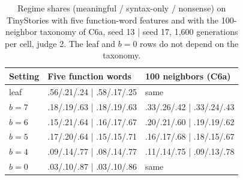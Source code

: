 \documentclass[11pt,letterpaper]{article}
\begin{document}
\begin{table}[h]
\caption{Regime shares (meaningful / syntax-only / nonsense) on TinyStories with five function-word features and with the 100-neighbor taxonomy of C6a, seed 13 | seed 17, 1,600 generations per cell, judge 2. The leaf and $b=0$ rows do not depend on the taxonomy.}
\label{tab:r232}
\begin{center}
\footnotesize
\begin{tabular}{lll}
\toprule
Setting & Five function words & 100 neighbors (C6a) \\
\midrule
leaf & .56/.21/.24 \;|\; .58/.17/.25 & same \\
$b=7$ & .18/.19/.63 \;|\; .18/.19/.63 & .33/.26/.42 \;|\; .33/.24/.43 \\
$b=6$ & .15/.21/.64 \;|\; .16/.17/.67 & .20/.21/.60 \;|\; .19/.19/.62 \\
$b=5$ & .17/.20/.64 \;|\; .15/.15/.71 & .16/.17/.68 \;|\; .18/.15/.67 \\
$b=4$ & .09/.14/.77 \;|\; .08/.14/.77 & .11/.14/.75 \;|\; .09/.13/.78 \\
$b=0$ & .03/.10/.87 \;|\; .03/.10/.86 & same \\
\bottomrule
\end{tabular}
\end{center}
\end{table}
\end{document}
